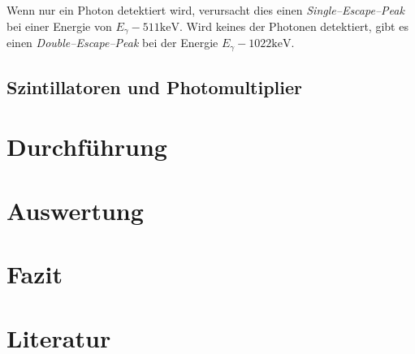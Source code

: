 \documentclass[12pt,a4paper]{scrartcl}
\numberwithin{equation}{section} %
\newcommand{\pu}[1]{\ensuremath{\mathrm{#1}}}
\renewcommand{\[}{} %
\renewcommand{\]}{\noindent} %
\begin{document}
Wenn nur ein Photon detektiert wird, verursacht dies einen
\emph{Single--Escape--Peak} bei einer Energie von
\(E_\gamma - \pu{511 keV}\). Wird keines der Photonen detektiert, gibt
es einen \emph{Double--Escape--Peak} bei der Energie
\(E_\gamma - \pu{1022 keV}\).

\hypertarget{szintillatoren-und-photomultiplier}{%
\subsection{Szintillatoren und Photomultiplier}\label{szintillatoren-und-photomultiplier}}

\clearpage
\hypertarget{durchfuxfchrung}{%
\section{Durchführung}\label{durchfuxfchrung}}

\clearpage
\hypertarget{auswertung}{%
\section{Auswertung}\label{auswertung}}

\clearpage
\hypertarget{fazit}{%
\section{Fazit}\label{fazit}}

\clearpage
\hypertarget{literatur}{%
\section{Literatur}\label{literatur}}
\end{document}
